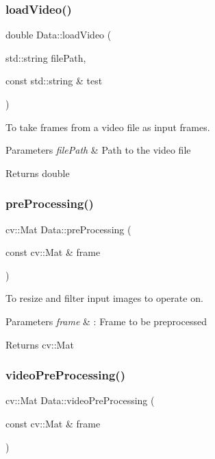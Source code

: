 \subsubsection{\texorpdfstring{load\+Video()}{loadVideo()}}
{\footnotesize\ttfamily double Data\+::load\+Video (\begin{DoxyParamCaption}\item[{std\+::string}]{file\+Path,  }\item[{const std\+::string \&}]{test }\end{DoxyParamCaption})}



To take frames from a video file as input frames. 


\begin{DoxyParams}{Parameters}
{\em file\+Path} & Path to the video file \\
\hline
\end{DoxyParams}
\begin{DoxyReturn}{Returns}
double 
\end{DoxyReturn}
\mbox{\label{classData_a8791dd62b1f57b4e4f2039e934ec7fdf}} 
\subsubsection{\texorpdfstring{pre\+Processing()}{preProcessing()}}
{\footnotesize\ttfamily cv\+::\+Mat Data\+::pre\+Processing (\begin{DoxyParamCaption}\item[{const cv\+::\+Mat \&}]{frame }\end{DoxyParamCaption})}



To resize and filter input images to operate on. 


\begin{DoxyParams}{Parameters}
{\em frame} & \+: Frame to be preprocessed \\
\hline
\end{DoxyParams}
\begin{DoxyReturn}{Returns}
cv\+::\+Mat 
\end{DoxyReturn}
\mbox{\label{classData_ab0eefc277a688a36ec7bef63e8807bc2}} 
\subsubsection{\texorpdfstring{video\+Pre\+Processing()}{videoPreProcessing()}}
{\footnotesize\ttfamily cv\+::\+Mat Data\+::video\+Pre\+Processing (\begin{DoxyParamCaption}\item[{const cv\+::\+Mat \&}]{frame }\end{DoxyParamCaption})}



